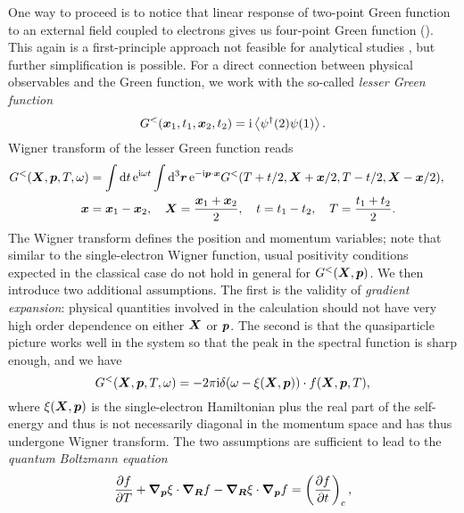 \documentclass[hyperref, a4paper]{article}
\newcommand*{\ii}{\mathrm{i}}
\newcommand*{\ee}{\mathrm{e}}
\begin{document}
One way to proceed is to notice that 
linear response of two-point Green function 
to an external field coupled to electrons 
gives us four-point Green function
().
This again is a first-principle approach 
not feasible for analytical studies
\cite{attaccalite2011real},
but further simplification is possible.
For a direct connection between physical observables and the Green function,
we work with the so-called \emph{lesser Green function}
\begin{equation}
    G^<(\vb*{x}_1, t_1, \vb*{x}_2, t_2) = \ii \expval{\psi^\dagger(2) \psi(1)}.
\end{equation}
Wigner transform of the lesser Green function reads
\begin{equation}
    \begin{aligned}
        G^<(\vb*{X}, \vb*{p}, T, \omega) &= 
        \int \dd{t} \ee^{\ii \omega t}
        \int \dd[3]{\vb*{r}} \ee^{- \ii \vb*{p} \cdot \vb*{x}} 
        G^<(T + t / 2, \vb*{X} + \vb*{x} / 2, T - t/2, \vb*{X} - \vb*{x} / 2), \quad \\
        \vb*{x} &= \vb*{x}_1 - \vb*{x}_2, \quad 
        \vb*{X} = \frac{\vb*{x}_1 + \vb*{x}_2}{2}, \quad 
        t = t_1 - t_2, \quad T = \frac{t_1 + t_2}{2}.
    \end{aligned}
    \label{eq:g-to-f}
\end{equation}
The Wigner transform
defines the position and momentum variables;
note that similar to the single-electron Wigner function,
usual positivity conditions expected in the classical case 
do not hold in general for $G^<(\vb*{X}, \vb*{p})$.
We then introduce two additional assumptions.
The first is the validity of \emph{gradient expansion}:
physical quantities involved in the calculation 
should not have very high order dependence on either $\vb*{X}$ or $\vb*{p}$.
The second is that the quasiparticle picture works well in the system 
so that the peak in the spectral function is sharp enough, and we have 
\begin{equation}
    G^<(\vb*{X}, \vb*{p}, T, \omega) = - 2 \pi \ii \delta(\omega - \xi(\vb*{X}, \vb*{p})) \cdot 
    f(\vb*{X}, \vb*{p}, T),
\end{equation}
where $\xi(\vb*{X}, \vb*{p})$ is the 
single-electron Hamiltonian plus the real part of the self-energy 
and thus is not necessarily diagonal in the momentum space 
and has thus undergone Wigner transform.
The two assumptions are sufficient to lead to the \emph{quantum Boltzmann equation}
\begin{equation}
    \pdv{f}{T} + \grad_{\vb*{p}} \xi \cdot \grad_{\vb*{R}} f 
    - \grad_{\vb*{R}} \xi \cdot \grad_{\vb*{p}} f 
    = \left(\pdv{f}{t}\right)_{\text{c}}, 
    \label{eq:quantum-boltzmann}
\end{equation}
\end{document}

